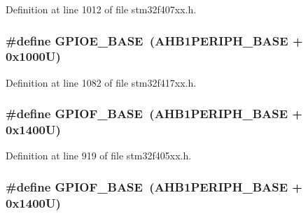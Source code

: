Definition at line 1012 of file stm32f407xx.\+h.

\subsubsection[{\texorpdfstring{G\+P\+I\+O\+E\+\_\+\+B\+A\+SE}{GPIOE_BASE}}]{\setlength{\rightskip}{0pt plus 5cm}\#define G\+P\+I\+O\+E\+\_\+\+B\+A\+SE~({\bf A\+H\+B1\+P\+E\+R\+I\+P\+H\+\_\+\+B\+A\+SE} + 0x1000\+U)}\hypertarget{group___peripheral__registers__structures_gab487b1983d936c4fee3e9e88b95aad9d}{}\label{group___peripheral__registers__structures_gab487b1983d936c4fee3e9e88b95aad9d}


Definition at line 1082 of file stm32f417xx.\+h.

\subsubsection[{\texorpdfstring{G\+P\+I\+O\+F\+\_\+\+B\+A\+SE}{GPIOF_BASE}}]{\setlength{\rightskip}{0pt plus 5cm}\#define G\+P\+I\+O\+F\+\_\+\+B\+A\+SE~({\bf A\+H\+B1\+P\+E\+R\+I\+P\+H\+\_\+\+B\+A\+SE} + 0x1400\+U)}\hypertarget{group___peripheral__registers__structures_ga7f9a3f4223a1a784af464a114978d26e}{}\label{group___peripheral__registers__structures_ga7f9a3f4223a1a784af464a114978d26e}


Definition at line 919 of file stm32f405xx.\+h.

\subsubsection[{\texorpdfstring{G\+P\+I\+O\+F\+\_\+\+B\+A\+SE}{GPIOF_BASE}}]{\setlength{\rightskip}{0pt plus 5cm}\#define G\+P\+I\+O\+F\+\_\+\+B\+A\+SE~({\bf A\+H\+B1\+P\+E\+R\+I\+P\+H\+\_\+\+B\+A\+SE} + 0x1400\+U)}\hypertarget{group___peripheral__registers__structures_ga7f9a3f4223a1a784af464a114978d26e}{}\label{group___peripheral__registers__structures_ga7f9a3f4223a1a784af464a114978d26e}



